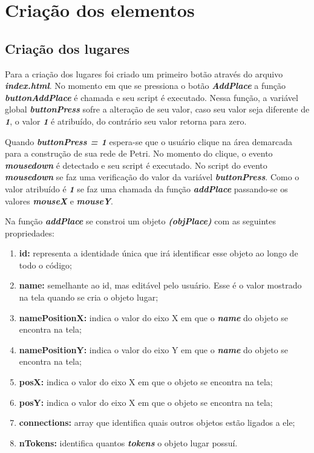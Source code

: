 \documentclass[
	12pt,				%
	openright,			%
	oneside,			%
	a4paper,			%
	english,			%
	brazil				%
	]{abntex2}
\begin{document}
\section{Criação dos elementos}


\subsection*{Criação dos lugares}

Para a criação dos lugares foi criado um primeiro botão através do arquivo \textit{\textbf{index.html}}. No momento em que se pressiona o botão \textit{\textbf{AddPlace}} a função \textit{\textbf{buttonAddPlace}} é chamada e seu script é executado. Nessa função, a variável global \textit{\textbf{buttonPress}} sofre a alteração de seu valor, caso seu valor seja diferente de \textit{\textbf{1}}, o valor \textit{\textbf{1}} é atribuído, do contrário seu valor retorna para zero.



Quando \textit{\textbf{buttonPress = 1}} espera-se que o usuário clique na área demarcada para a construção de sua rede de Petri. No momento do clique, o evento \textit{\textbf{mousedown}} é detectado e seu script é executado. No script do evento \textit{\textbf{mousedown}} se faz uma verificação do valor da variável \textit{\textbf{buttonPress}}. Como o valor atribuído é \textit{\textbf{1}} se faz uma chamada da função \textit{\textbf{addPlace}} passando-se os valores \textbf{\textit{mouseX}} e \textbf{\textit{mouseY}}. 



Na função \textbf{\textit{addPlace}} se constroi um objeto \textbf{\textit{(objPlace)}} com as seguintes propriedades: 

\begin{enumerate}
	\item \textbf{id:} representa a identidade única que irá identificar esse objeto ao longo de todo o código;
	\item \textbf{name:} semelhante ao id, mas editável pelo usuário. Esse é o valor mostrado na tela quando se cria o objeto lugar;
	\item \textbf{namePositionX:} indica o valor do eixo X em que o \textbf{\textit{name}} do objeto se encontra na tela;
	\item \textbf{namePositionY:} indica o valor do eixo Y em que o \textbf{\textit{name}} do objeto se encontra na tela;
	\item \textbf{posX:} indica o valor do eixo X em que o objeto se encontra na tela;
	\item \textbf{posY:} indica o valor do eixo X em que o objeto se encontra na tela;
	\item \textbf{connections:} array que identifica quais outros objetos estão ligados a ele;
	\item \textbf{nTokens:} identifica quantos \textbf{\textit{tokens}} o objeto lugar possuí.
\end{enumerate}
\end{document}
